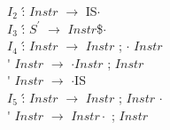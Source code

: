 \documentclass{article}
\begin{document}
\begin{enumerate}
\begin{enumerate}
\begin{tabbing}
						\>$I_{2}$	\' : 	\> $Instr$ 			\> $\longrightarrow$\> 	IS$\cdot$	\\

						\>$I_{3}$	\' : 	\> $S^{\prime}$		\> $\longrightarrow$\> 	$Instr$\$$\cdot$	\\

						\>$I_{4}$	\' : 	\> $Instr$			\> $\longrightarrow$\> 	$Instr$ ; $\cdot$ $Instr$	\\
						\>			\'  	\> $Instr$ 			\> $\longrightarrow$\> 	$\cdot Instr$ ; $Instr$	\\
						\>			\'  	\> $Instr$ 			\> $\longrightarrow$\> 	$\cdot$IS	\\

						\>$I_{5}$	\' : 	\> $Instr$			\> $\longrightarrow$\> 	$Instr$ ; $Instr$ $\cdot$	\\
						\>			\'  	\> $Instr$ 			\> $\longrightarrow$\> 	$Instr \cdot$ ; $Instr$	\\
					\end{tabbing}


\end{enumerate}
\end{enumerate}
\end{document}
